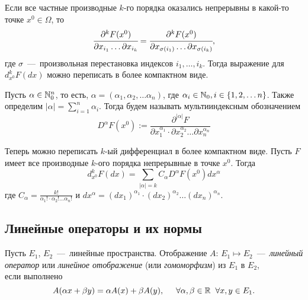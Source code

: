 \begin{note}
    Если все частные производные $k$-го порядка оказались непрерывны в какой-то точке $x^{0} \in \Omega$, то 
    $$ \cfrac{\partial^{k} F (x^{0})}{\partial x_{i_1} \ldots \partial x_{i_k}} = \cfrac{\partial^{k} F (x^{0})}{\partial x_{\sigma(i_1)} \ldots \partial x_{\sigma(i_k)}},$$
    где $\sigma$~---~произвольная перестановка индексов $i_{1}, \ldots, i_{k}$. Тогда выражение для $d_{x^0}^{k} F (dx)$ можно переписать в более компактном виде.
\end{note}


\begin{definition}
    Пусть $\alpha \in \mathbb{N}_{0}^{n}$, то есть, $\alpha = (\alpha_1, \alpha_2, \dots \alpha_n)$, где $\alpha_i \in \mathbb{N}_{0}, i \in \{1, 2, \dots n\}$. Также определим $|\alpha| = \sum_{i = 1}^n \alpha_i$. Тогда будем называть мультииндексным обозначением
    \[D^\alpha F(x^0) := \frac{\partial^{|\alpha|} F}{\partial x_1^{\alpha_1} \cdot \partial x_2^{\alpha_2} \dots \partial x_n^{\alpha_n}}\]
\end{definition}

\begin{note} 
    Теперь можно переписать $k$-ый дифференциал в более компактном виде.
    Пусть $F$ имеет все производные $k$-ого порядка непрерывные в точке $x^{0}$. Тогда \[d_{x^0}^k F(d x) = \sum_{|\alpha| = k} C_{\alpha} D^{\alpha} F(x^0) dx^{\alpha}\]
    где $C_{\alpha} = \frac{k!}{\alpha_1! \cdot \alpha_2! \dots \alpha_n!}$ и $dx^{\alpha} = (dx_1)^{\alpha_1} \cdot (dx_2)^{\alpha_2} \dots (dx_n)^{\alpha_n}$.
    
\end{note}

\newpage

\subsection{Линейные операторы и их нормы}

\begin{definition}
    Пусть $E_1$, $E_2$~---~линейные пространства. 
    Отображение $A$: $E_1 \mapsto E_2$~---~\textit{линейный оператор} или \textit{линейное отображение} (или \textit{гомоморфизм}) из $E_1$ в $E_2$, \\
    если выполнено \[A(\alpha x + \beta y) = \alpha A(x) + \beta A(y), \hspace{0.5cm} \forall \alpha, \beta \in \mathbb{R} \hspace{0.2cm} \forall x, y \in E_{1}.\]
\end{definition}


